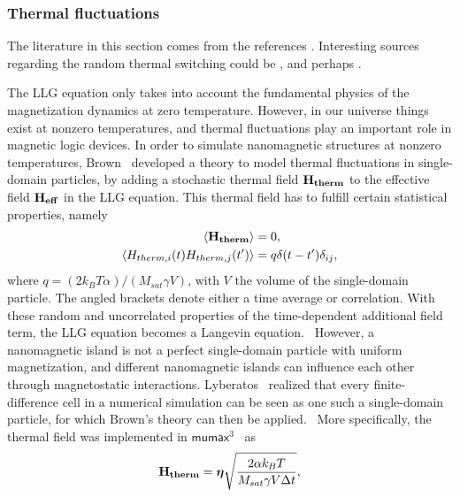 \documentclass[12pt,a4paper]{article}
\renewcommand{\vec}[1]{\boldsymbol{#1}}
\newcommand{\mumax}{$\mathsf{mumax}^3$}
\begin{document}
\subsubsection{Thermal fluctuations}
The literature in this section comes from the references \cite{LEL-17b}. 
Interesting sources regarding the random thermal switching could be \cite{ThermFluc_SingleDomain, RandomSwitch_MonteCarlo, Nonmonotonic_reversal}, and perhaps \cite{MagDynamics_JumpNoise}. \par
The LLG equation only takes into account the fundamental physics of the magnetization dynamics at zero temperature. However, in our universe things exist at nonzero temperatures, and thermal fluctuations play an important role in magnetic logic devices. %
In order to simulate nanomagnetic structures at nonzero temperatures, Brown~\cite{ThermFluc_SingleDomain} developed a theory to model thermal fluctuations in single-domain particles, by adding a stochastic thermal field $\vb{H_{therm}}$ to the effective field $\vb{H_{eff}}$ in the LLG equation. This thermal field has to fulfill certain statistical properties, namely
\begin{align*}
    \langle \vb{H_{therm}} \rangle &= 0 \mathrm{,} \\
    \langle H_{therm,i}(t) H_{therm,j}(t') \rangle &= q \delta(t-t') \delta_{ij} \mathrm{,}
\end{align*}
where $q=(2 k_B T \alpha)/(M_{sat} \gamma V)$, with $V$ the volume of the single-domain particle. The angled brackets denote either a time average or correlation. With these random and uncorrelated properties of the time-dependent additional field term, the LLG equation becomes a Langevin equation.~\cite{ThermFluc_SingleDomain} However, a nanomagnetic island is not a perfect single-domain particle with uniform magnetization, and different nanomagnetic islands can influence each other through magnetostatic interactions.
Lyberatos~\cite{Lyberatos_1993} realized that every finite-difference cell in a numerical simulation can be seen as one such a single-domain particle, for which Brown's theory can then be applied.~\cite{phd_leliaert} More specifically, the thermal field was implemented in \mumax{}~\cite{LEL-17b,MuMax3} as
\begin{equation}
    \vb{H_{therm}} = \vec{\eta} \sqrt{\frac{2 \alpha k_B T}{M_{sat} \gamma V \Delta t}} \mathrm{,}
    \label{eq:H_therm}
\end{equation}
\end{document}
